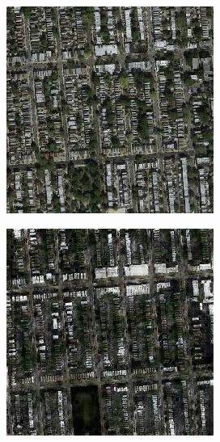 \begin{figure}
  \medskip

  \begin{subfigure}[t]{.14\textwidth}
    \centering
    \includegraphics[width=\linewidth]{images/cycleGanResults/Satelite10_Or_Ld120_E100_Lr0002.jpg}
  \end{subfigure}
  \begin{subfigure}[t]{.14\textwidth}
    \centering
    \includegraphics[width=\linewidth]{images/cycleGanResults/Satelite10_Ld120_E100_Lr0002.jpg}

\end{subfigure}
\end{figure}
